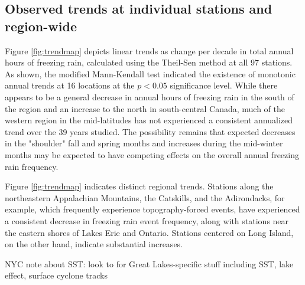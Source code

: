 \documentclass[twocol]{ametsoc}
\begin{document}
\subsection{Observed trends at individual stations and region-wide}


Figure \ref{fig:trendmap} depicts linear trends as change per decade in total annual hours of freezing rain, calculated using the Theil-Sen method at all 97 stations. As shown, the modified Mann-Kendall test indicated the existence of monotonic annual trends at 16 locations at the $p<0.05$ significance level. While there appears to be a general decrease in annual hours of freezing rain in the south of the region and an increase to the north in south-central Canada, much of the western region in the mid-latitudes has not experienced a consistent annualized trend over the 39 years studied. The possibility remains that expected decreases in the "shoulder" fall and spring months and increases during the mid-winter months may be expected to have competing effects on the overall annual freezing rain frequency.

Figure \ref{fig:trendmap} indicates distinct regional trends. Stations along the northeastern Appalachian Mountains, the Catskills, and the Adirondacks, for example, which frequently experience topography-forced events, have experienced a consistent decrease in freezing rain event frequency, along with stations near the eastern shores of Lakes Erie and Ontario. Stations centered on Long Island, on the other hand, indicate substantial increases. 

NYC note about SST: \citet{ramos2006sensitivity}
look to \citet{cortinas2000climatology} for Great Lakes-specific stuff including SST, lake effect, surface cyclone tracks
\end{document}
